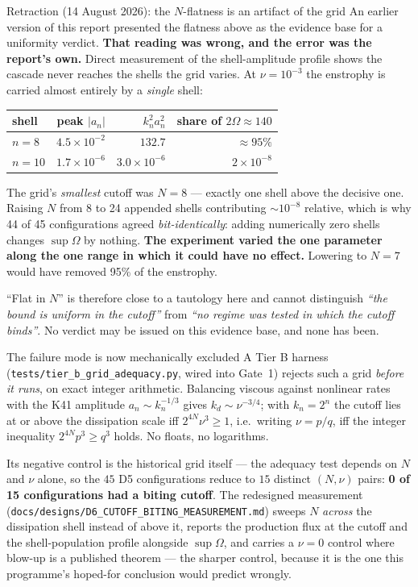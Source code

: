 \documentclass[11pt,a4paper]{article}
\theoremstyle{definition}
\theoremstyle{plain}
\begin{document}
\begin{warnbox}{Retraction (14 August 2026): the $N$-flatness is an artifact of the grid}
An earlier version of this report presented the flatness above as the evidence base for a
uniformity verdict. \textbf{That reading was wrong, and the error was the report's own.} Direct
measurement of the shell-amplitude profile shows the cascade never reaches the shells the grid
varies. At $\nu=10^{-3}$ the enstrophy is carried almost entirely by a \emph{single} shell:

\begin{center}
\small
\begin{tabular}{@{}lrrr@{}}
\toprule
shell & peak $|a_n|$ & $k_n^2a_n^2$ & share of $2\Omega\approx140$ \\
\midrule
$n=8$  & $4.5\times10^{-2}$ & $132.7$ & $\approx 95\%$ \\
$n=10$ & $1.7\times10^{-6}$ & $3.0\times10^{-6}$ & $2\times10^{-8}$ \\
\bottomrule
\end{tabular}
\end{center}

The grid's \emph{smallest} cutoff was $N=8$ --- exactly one shell above the decisive one. Raising
$N$ from 8 to 24 appended shells contributing $\sim10^{-8}$ relative, which is why 44 of 45
configurations agreed \emph{bit-identically}: adding numerically zero shells changes $\sup\Omega$
by nothing. \textbf{The experiment varied the one parameter along the one range in which it could
have no effect.} Lowering to $N=7$ would have removed 95\% of the enstrophy.

``Flat in $N$'' is therefore close to a tautology here and cannot distinguish
\emph{``the bound is uniform in the cutoff''} from \emph{``no regime was tested in which the
cutoff binds''}. No verdict may be issued on this evidence base, and none has been.
\end{warnbox}

\begin{keybox}{The failure mode is now mechanically excluded}
A Tier B harness (\texttt{tests/tier\_b\_grid\_adequacy.py}, wired into Gate~1) rejects such a
grid \emph{before it runs}, on exact integer arithmetic. Balancing viscous against nonlinear
rates with the K41 amplitude $a_n\sim k_n^{-1/3}$ gives $k_d\sim\nu^{-3/4}$; with $k_n=2^n$ the
cutoff lies at or above the dissipation scale iff $2^{4N}\nu^3\ge1$, i.e.\ writing $\nu=p/q$,
iff the integer inequality $2^{4N}p^3\ge q^3$ holds. No floats, no logarithms.

Its negative control is the historical grid itself --- the adequacy test depends on $N$ and
$\nu$ alone, so the $45$ D5 configurations reduce to $15$ distinct $(N,\nu)$ pairs:
\textbf{0 of 15 configurations had a biting
cutoff}. The redesigned measurement (\texttt{docs/designs/D6\_CUTOFF\_BITING\_MEASUREMENT.md})
sweeps $N$ \emph{across} the dissipation shell instead of above it, reports the production flux
at the cutoff and the shell-population profile alongside $\sup\Omega$, and carries a $\nu=0$
control where blow-up is a published theorem --- the sharper control, because it is the one this
programme's hoped-for conclusion would predict wrongly.
\end{keybox}
\end{document}
